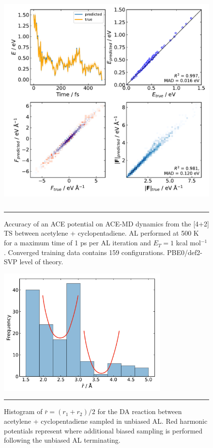 \documentclass[11pt]{article}
\numberwithin{equation}{subsection}
\newcommand{\kcal}{kcal mol$^{-1}$}
\begin{document}
\begin{figure}[h!]
	\centering
	\vspace{0.4cm}
	\includegraphics[height=11.2cm]{figSX38.pdf}
	\vspace{0.1cm}
	\hrule
	\vspace{0.1cm}
	\caption{Accuracy of an ACE potential on ACE-MD dynamics from the [4+2] TS between acetylene + cyclopentadiene. AL performed at 500 K for a maximum time of 1 ps per AL iteration and $E_T = 1$ \kcal. Converged training data contains 159 configurations. PBE0/def2-SVP level of theory.}
	\label{fig::SX38}
\end{figure}


\begin{figure}[h!]
	\centering
	\vspace{0.4cm}
	\includegraphics[height=6.4cm]{figSX39.pdf}
	\vspace{0.1cm}
	\hrule
	\vspace{0.1cm}
	\caption{Histogram of $\bar{r} = (r_1 + r_2) / 2$ for the DA reaction between acetylene + cyclopentadiene sampled in unbiased AL. Red harmonic potentials represent where additional biased sampling is performed following the unbiased AL terminating.}
	\label{fig::SX39}
\end{figure}
\end{document}
